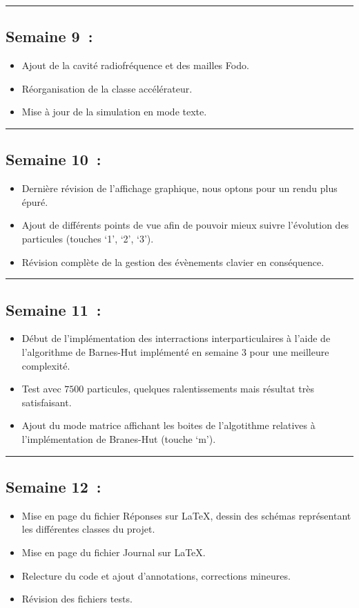 \documentclass[12pt, letterpaper, twoside]{article}
\begin{document}
\rule{\textwidth}{0.4pt}

\subsection{Semaine 9 :}
\begin{itemize}
\item Ajout de la cavité radiofréquence et des mailles Fodo.
\item Réorganisation de la classe accélérateur.
\item Mise à jour de la simulation en mode texte.
\end{itemize}

\rule{\textwidth}{0.4pt}

\subsection{Semaine 10 :}
\begin{itemize}
\item Dernière révision de l’affichage graphique, nous optons pour un rendu plus épuré.
\item Ajout de différents points de vue afin de pouvoir mieux suivre l’évolution des particules (touches `1', `2', `3').
\item Révision complète de la gestion des évènements clavier en conséquence.
\end{itemize}

\rule{\textwidth}{0.4pt}

\subsection{Semaine 11 :}
\begin{itemize}
\item Début de l’implémentation des interractions interparticulaires à l’aide de l’algorithme de Barnes-Hut implémenté en semaine 3 pour une meilleure complexité.
\item Test avec $7500$ particules, quelques ralentissements mais résultat très satisfaisant. 
\item Ajout du mode matrice affichant les boites de l’algotithme relatives à l'implémentation de Branes-Hut (touche `m').
\end{itemize}

\rule{\textwidth}{0.4pt}

\subsection{Semaine 12 :}
\begin{itemize}
\item Mise en page du fichier Réponses sur \LaTeX, dessin des schémas représentant les différentes classes du projet.
\item Mise en page du fichier Journal sur \LaTeX.
\item Relecture du code et ajout d’annotations, corrections mineures. 
\item Révision des fichiers tests.
\end{itemize}
\end{document}
